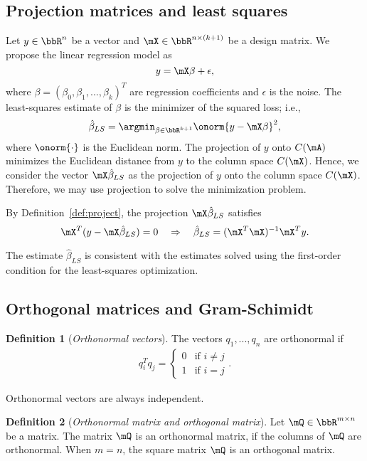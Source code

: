 \documentclass[11pt]{article}
\theoremstyle{plain}
\theoremstyle{definition}
\newtheorem{defn}{Definition}
\begin{document}
\subsection{Projection matrices and least squares}
Let $y \in \bbR^n$ be a vector and $\mX \in \bbR^{n \times (k+1)}$ be a design matrix. We propose the linear regression model as
\[ y = \mX \beta +\epsilon,\]
where $\beta = (\beta_0,\beta_1,...,\beta_k)^T$ are regression coefficients and $\epsilon$ is the noise. The least-squares estimate of $\beta$ is the minimizer of the squared loss; i.e.,
\[  \hat \beta_{LS} = \argmin_{\beta \in \bbR^{k+1}} \onorm{y - \mX \beta}^2, \]
where $\onorm{\cdot}$ is the Euclidean norm.  The projection of $y$ onto $C(\mA)$ minimizes the Euclidean distance from $y$ to the column space $C(\mX)$. Hence,   we consider the vector $\mX 
\hat \beta_{LS}$ as the projection of $y$ onto the column space $C(\mX)$. Therefore, we may use projection to solve the minimization problem. 

By Definition~\ref{def:project}, the projection $\mX \hat \beta_{LS}$ satisfies
\[ \mX^T( y - \mX \hat \beta_{LS} ) = 0 \quad \Rightarrow \quad \hat \beta_{LS} = (\mX^T \mX)^{-1} \mX^T y. \]

The estimate $\hat \beta_{LS}$ is consistent with the estimates solved using the first-order condition for the least-squares optimization. 

\subsection{Orthogonal matrices and Gram-Schimidt}
\begin{defn}[\textit{Orthonormal vectors}]\label{def:othronov}
	The vectors $q_1,...,q_n$ are orthonormal if
	\begin{align}
		q_i^T q_j = \begin{cases}
			0& \text{if } i\neq j\\
			1 & \text{if } i =  j
		\end{cases}.
	\end{align}
\end{defn}

Orthonormal vectors are always independent.

\begin{defn}[\textit{Orthonormal matrix and orthogonal matrix}]\label{def:orthonom}
	Let  $\mQ \in \bbR^{m \times n}$ be a matrix. The matrix $\mQ$ is an orthonormal matrix, if the columns of $\mQ$ are orthonormal. When $ m= n$, the square matrix $\mQ$ is an orthogonal matrix.
\end{defn}
\end{document}
